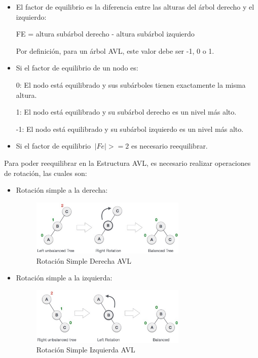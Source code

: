 \documentclass{article}
\begin{document}
\begin{enumerate}
 \begin{itemize}
   \item El factor de equilibrio es la diferencia entre las alturas del árbol derecho y el izquierdo:
   
   FE = altura subárbol derecho - altura subárbol izquierdo
   
   Por definición, para un árbol AVL, este valor debe ser -1, 0 o 1.
   \item Si el factor de equilibrio de un nodo es:
   
   0: El nodo está equilibrado y sus subárboles tienen exactamente la misma altura.
   
   1: El nodo está equilibrado y su subárbol derecho es un nivel más alto.
   
   -1: El nodo está equilibrado y su subárbol izquierdo es un nivel más alto.
   \item Si el factor de equilibrio $\ |Fe|>=2 $ es necesario reequilibrar.
\end{itemize}

Para poder reequilibrar en la Estructura AVL, es necesario realizar operaciones de rotación, las cuales son:

 \begin{itemize}
   \item Rotación simple a la derecha:

\begin{figure}[H]
\centering
\includegraphics[width=0.7\textwidth]{Img/avl_right_rotation.jpg}
\caption{Rotación Simple Derecha AVL}
\end{figure}
   
   \item Rotación simple a la izquierda:

\begin{figure}[H]
\centering
\includegraphics[width=0.7\textwidth]{Img/avl_left_rotation.jpg}
\caption{Rotación Simple Izquierda AVL}
\end{figure}
   

\end{itemize}
\end{enumerate}
\end{document}
